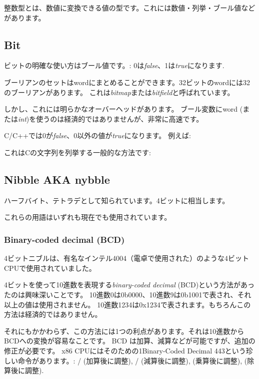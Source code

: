 
整数型とは、数値に変換できる値の型です。これには数値・列挙・ブール値などがあります。

\subsection{Bit}

ビットの明確な使い方はブール値です。: 0は\emph{false}、1は\emph{true}になります.

ブーリアンのセットは\gls{word}にまとめることができます。32ビットのwordには32のブーリアンがあります。
これは\emph{bitmap}または\emph{bitfield}と呼ばれています。

しかし、これには明らかなオーバーヘッドがあります。
ブール変数に\gls{word} (または\emph{int})を使うのは経済的ではありませんが、非常に高速です。

C/C++では0が\emph{false}、0以外の値が\emph{true}になります。
例えば:



これはCの文字列を列挙する一般的な方法です:



\subsection{Nibble AKA nybble}

ハーフバイト、テトラデ\ac{として知られています}。4ビットに相当します。

これらの用語はいずれも現在でも使用されています。

\subsubsection{Binary-coded decimal (\ac{BCD})}
\label{BCD}


4ビットニブルは、有名なインテル4004（電卓で使用された）のような4ビットCPUで使用されていました。

4ビットを使って10進数を表現する\emph{binary-coded decimal} (\ac{BCD})という方法があったのは興味深いことです。
10進数0は0b0000、10進数9は0b1001で表され、それ以上の値は使用されません。
10進数1234は0x1234で表されます。もちろんこの方法は経済的ではありません。

それにもかかわらず、この方法には1つの利点があります。それは10進数から\ac{BCD}への変換が容易なことです。
BCD は加算、減算などが可能ですが、追加の修正が必要です。 
x86 CPUにはそのための1Binary-Coded Decimal 443という珍しい命令があります。:
/ (加算後に調整),
/ (減算後に調整),
 (乗算後に調整),
 (除算後に調整).

